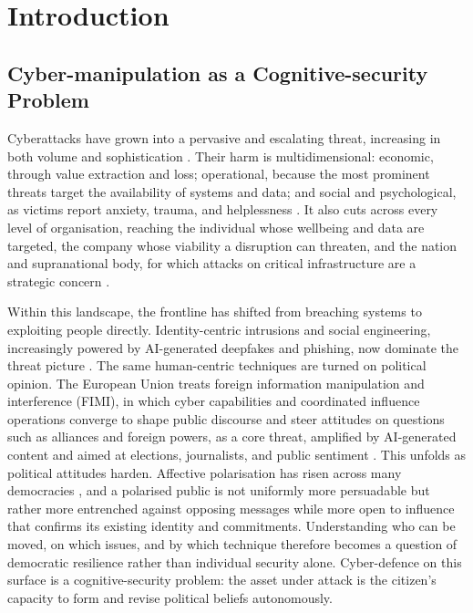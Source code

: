 \documentclass[11pt,a4paper]{article}
\begin{document}
\vspace{0.6em}

\clearpage
\section{Introduction}

\subsection{Cyber-manipulation as a Cognitive-security Problem}

Cyberattacks have grown into a pervasive and escalating threat, increasing in both
volume and sophistication \citep{councileu2025cyber,liliu2021comprehensive}. Their harm
is multidimensional: economic, through value extraction and loss; operational, because
the most prominent threats target the availability of systems and data; and social and
psychological, as victims report anxiety, trauma, and helplessness
\citep{bada2020social,councileu2025cyber}. It also cuts across every level of
organisation, reaching the individual whose wellbeing and data are targeted, the
company whose viability a disruption can threaten, and the nation and supranational body,
for which attacks on critical infrastructure are a strategic concern
\citep{bada2020social,ryan2025impact}.

Within this landscape, the frontline has shifted from breaching systems to exploiting
people directly. Identity-centric intrusions and social engineering, increasingly
powered by AI-generated deepfakes and phishing, now dominate the threat picture
\citep{bada2020social,inkster2023cybersecurity,mcconkey2026annual}. The same
human-centric techniques are turned on political opinion. The European Union treats
foreign information manipulation and interference (FIMI), in which cyber capabilities
and coordinated influence operations converge to shape public discourse and steer
attitudes on questions such as alliances and foreign powers, as a core threat, amplified
by AI-generated content and aimed at elections, journalists, and public sentiment
\citep{enisa2023elections,enisaeeas2022fimi}. This unfolds as political attitudes harden.
Affective polarisation has risen across many democracies \citep{reiljan2020fear}, and a
polarised public is not uniformly more persuadable but rather more entrenched against
opposing messages while more open to influence that confirms its existing identity and
commitments. Understanding who can be moved, on which issues, and by which technique
therefore becomes a question of democratic resilience rather than individual security
alone. Cyber-defence on this surface is a cognitive-security problem: the asset under
attack is the citizen's capacity to form and revise political beliefs autonomously.
\end{document}
